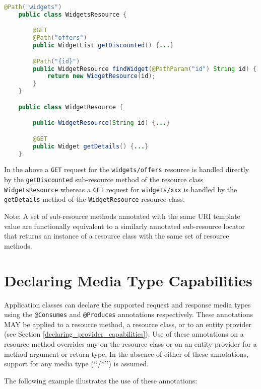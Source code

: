 \begin{lstlisting}[language=Java]
    @Path("widgets")
    public class WidgetsResource {

        @GET
        @Path("offers")
        public WidgetList getDiscounted() {...}

        @Path("{id}")
        public WidgetResource findWidget(@PathParam("id") String id) {
            return new WidgetResource(id);
        }
    }

    public class WidgetResource {

        public WidgetResource(String id) {...}

        @GET
        public Widget getDetails() {...}
    }
\end{lstlisting}

In the above a \lstinline{GET} request for the \lstinline{widgets/offers} resource is handled directly by the
\lstinline{getDiscounted} sub-resource method of the resource class
\lstinline{WidgetsResource} whereas a \lstinline{GET} request for \lstinline{widgets/xxx} is handled by the
\lstinline{getDetails} method of the \lstinline{WidgetResource} resource class.

Note: A set of sub-resource methods annotated with the same URI template value are functionally equivalent to a
similarly annotated sub-resource locator that returns an instance of a resource class with the same set of resource
methods.

\section{Declaring Media Type Capabilities}
\label{declaring_method_capabilities}

\textcolor{highlight green}{Application classes can declare the supported request and response media types using the
\lstinline{@Consumes} and \lstinline{@Produces} annotations respectively}. These annotations MAY be applied to a
resource method, a resource class, or to an entity provider (see Section \ref{declaring_provider_capabilities}). Use of
these annotations on a resource method overrides any on the resource class or on an entity provider for a method
argument or return type. In the absence of either of these annotations, support for any media type (\lq\lq*/*\rq\rq) is
assumed.

The following example illustrates the use of these annotations:

